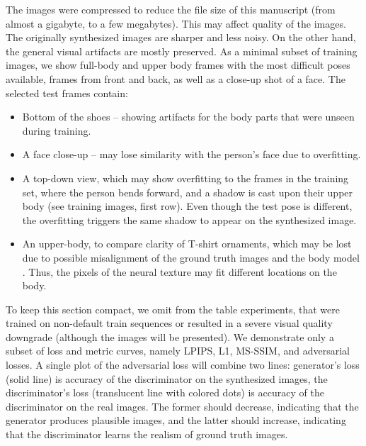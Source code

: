 The images were compressed to reduce the file size of this manuscript (from almost a gigabyte, to a few megabytes). This may affect quality of the images. The originally synthesized images are sharper and less noisy. On the other hand, the general visual artifacts are mostly preserved. As a minimal subset of training images, we show full-body and upper body frames with the most difficult poses available, frames from front and back, as well as a close-up shot of a face. The selected test frames contain:
\begin{itemize}
	\item Bottom of the shoes -- showing artifacts for the body parts that were unseen during training.
	\item A face close-up -- may lose similarity with the person's face due to overfitting.
	\item A top-down view, which may show overfitting to the frames in the training set, where the person bends forward, and a shadow is cast upon their upper body (see training images, first row). Even though the test pose is different, the overfitting triggers the same shadow to appear on the synthesized image.
	\item An upper-body, to compare clarity of T-shirt ornaments, which may be lost due to possible misalignment of the ground truth images and the body model \cite{dnn:smplx19}. Thus, the pixels of the neural texture may fit different locations on the body.
\end{itemize}

To keep this section compact, we omit from the table experiments, that were trained on non-default train sequences or resulted in a severe visual quality downgrade (although the images will be presented). We demonstrate only a subset of loss and metric curves, namely LPIPS, L1, MS-SSIM, and adversarial losses. A single plot of the adversarial loss will combine two lines: generator's loss (solid line) is accuracy of the discriminator on the synthesized images, the discriminator's loss (translucent line with colored dots) is accuracy of the discriminator on the real images. The former should decrease, indicating that the generator produces plausible images, and the latter should increase, indicating that the discriminator learns the realism of ground truth images.

